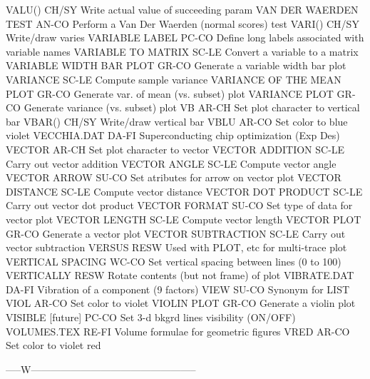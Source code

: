 VALU()                      CH/SY Write actual value of succeeding param
VAN DER WAERDEN TEST        AN-CO Perform a Van Der Waerden (normal scores) test
VARI()                      CH/SY Write/draw varies
VARIABLE LABEL              PC-CO Define long labels associated with variable names
VARIABLE TO MATRIX          SC-LE Convert a variable to a matrix
VARIABLE WIDTH BAR PLOT     GR-CO Generate a variable width bar plot
VARIANCE                    SC-LE Compute sample variance
VARIANCE OF THE MEAN PLOT   GR-CO Generate var. of mean (vs. subset) plot
VARIANCE PLOT               GR-CO Generate variance (vs. subset) plot
VB                          AR-CH Set plot character to vertical bar
VBAR()                      CH/SY Write/draw vertical bar
VBLU                        AR-CO Set color to blue violet
VECCHIA.DAT                 DA-FI Superconducting chip optimization (Exp Des)
VECTOR                      AR-CH Set plot character to vector
VECTOR ADDITION             SC-LE Carry out vector addition
VECTOR ANGLE                SC-LE Compute vector angle
VECTOR ARROW                SU-CO Set atributes for arrow on vector plot
VECTOR DISTANCE             SC-LE Compute vector distance
VECTOR DOT PRODUCT          SC-LE Carry out vector dot product
VECTOR FORMAT               SU-CO Set type of data for vector plot
VECTOR LENGTH               SC-LE Compute vector length
VECTOR PLOT                 GR-CO Generate a vector plot
VECTOR SUBTRACTION          SC-LE Carry out vector subtraction
VERSUS                      RESW  Used with PLOT, etc for multi-trace plot
VERTICAL SPACING            WC-CO Set vertical spacing between lines (0 to 100)
VERTICALLY                  RESW  Rotate contents (but not frame) of plot
VIBRATE.DAT                 DA-FI Vibration of a component (9 factors)
VIEW                        SU-CO Synonym for LIST
VIOL                        AR-CO Set color to violet
VIOLIN PLOT                 GR-CO Generate a violin plot
VISIBLE    [future]         PC-CO Set 3-d bkgrd lines visibility (ON/OFF)
VOLUMES.TEX                 RE-FI Volume formulae for geometric figures
VRED                        AR-CO Set color to violet red

-----W--------------------------------------------------

